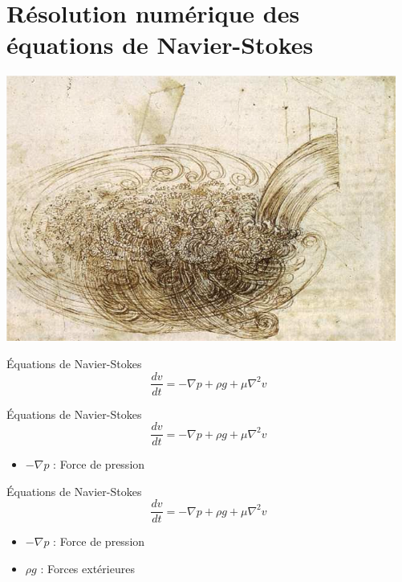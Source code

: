 \documentclass{article}
\begin{document}
\section{Résolution numérique des équations de Navier-Stokes}
\begin{center}
    \includegraphics*{NavierStokes.png}
\end{center}

\newpage
\vspace*{2pt}
\thispagestyle{landscape}
\begin{center}
    Équations de Navier-Stokes
    $$\frac{dv}{dt} = -\nabla p + \rho g + \mu \nabla ^2 v$$
\end{center}

\newpage
\vspace*{2pt}
\thispagestyle{landscape}
\begin{center}
    Équations de Navier-Stokes
    $$\frac{dv}{dt} = -\nabla p + \rho g + \mu \nabla ^2 v$$
\end{center}
\begin{itemize}
    \item $-\nabla p $ : Force de pression
\end{itemize}

\newpage
\vspace*{2pt}
\thispagestyle{landscape}
\begin{center}
    Équations de Navier-Stokes
    $$\frac{dv}{dt} = -\nabla p + \rho g + \mu \nabla ^2 v$$
\end{center}
\begin{itemize}
    \item $-\nabla p $ : Force de pression
    \item $ \rho g $ : Forces extérieures
\end{itemize}
\end{document}

